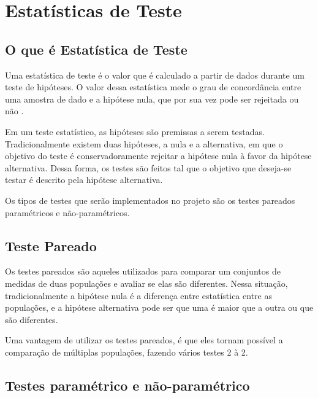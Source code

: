 


\chapter{Estatísticas de Teste}
\label{chap:testStatistics}

\section{O que é Estatística de Teste}
Uma estatística de teste é o valor que é calculado a partir de dados durante um teste de hipóteses. O valor dessa estatística mede o grau de concordância entre uma amostra de dado e a hipótese nula, que por sua vez pode ser rejeitada ou não \cite{Casella2002}. 

Em um teste estatístico, as hipóteses são premissas a serem testadas. Tradicionalmente existem duas hipóteses, a nula e a alternativa, em que o objetivo do teste é conservadoramente rejeitar a hipótese nula à favor da hipótese alternativa. Dessa forma, os testes são feitos tal que o objetivo que deseja-se testar é descrito pela hipótese alternativa.

Os tipos de testes que serão implementados no projeto são os testes pareados paramétricos e não-paramétricos.

\section{Teste Pareado}
Os testes pareados são aqueles utilizados para comparar um conjuntos de medidas de duas populações e avaliar se elas são diferentes. Nessa situação, tradicionalmente a hipótese nula é a diferença entre estatística entre as populações, e a hipótese alternativa pode ser que uma é maior que a outra ou que são diferentes.

Uma vantagem de utilizar os testes pareados, é que eles tornam possível a comparação de múltiplas populações, fazendo vários testes 2 à 2.

\section{Testes paramétrico e não-paramétrico}


